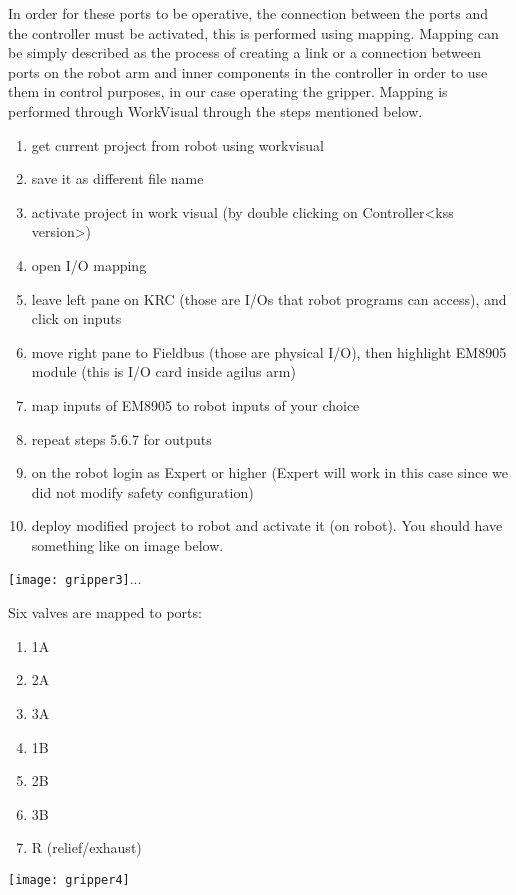  		\bigskip
 		In order for these ports to be operative, the connection between the ports and the controller must be activated, this is performed using mapping. Mapping can be simply described as the process of creating a link or a connection between ports on the robot arm and inner components in the controller in order to use them in control purposes, in our case operating the gripper. Mapping is performed through WorkVisual through the steps mentioned below.
 			\begin{enumerate}
 				\item get current project from robot using workvisual
 				\item save it as different file name
 				\item activate project in work visual (by double clicking on Controller<kss version>)
 				\item open I/O mapping
 				\item leave left pane on KRC (those are I/Os that robot programs can access), and click on inputs
 				\item move right pane to Fieldbus (those are physical I/O), then highlight EM8905 module (this is I/O card inside agilus arm)
 				\item map inputs of EM8905 to robot inputs of your choice
 				\item repeat steps 5.6.7 for outputs
 				\item on the robot login as Expert or higher (Expert will work in this case since we did not modify safety configuration)
 				\item deploy modified project to robot and activate it (on robot).
 				You should have something like on image below. 
 			\end{enumerate}
 		\begin{center}
 			\texttt{[image: gripper3]}...
 		\end{center}
 	Six valves are mapped to ports:
 	\newline
 		\begin{minipage}{0.5\textwidth}
 			\begin{enumerate}
 				\item 1A
 				\item 2A
 				\item 3A
 				\item 1B
 				\item 2B
 				\item 3B
 				\item R (relief/exhaust) 
 			\end{enumerate}	
 	\end{minipage} \hfill
 	\begin{minipage}{0.5\textwidth}
 			\texttt{[image: gripper4]}
 	\end{minipage}
 
